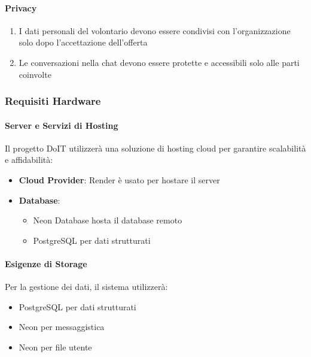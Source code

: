 \paragraph{Privacy}

\begin{enumerate}
    \item I dati personali del volontario devono essere condivisi con l'organizzazione solo dopo l'accettazione dell'offerta
    \item Le conversazioni nella chat devono essere protette e accessibili solo alle parti coinvolte
\end{enumerate}

\subsubsection{Requisiti Hardware}

\paragraph{Server e Servizi di Hosting}

Il progetto DoIT utilizzerà una soluzione di hosting cloud per garantire scalabilità e affidabilità:

\begin{itemize}
    \item \textbf{Cloud Provider}: Render è usato per hostare il server
    \item \textbf{Database}:
    \begin{itemize}
        \item Neon Database hosta il database remoto
        \item PostgreSQL per dati strutturati
    \end{itemize}
\end{itemize}

\paragraph{Esigenze di Storage}

Per la gestione dei dati, il sistema utilizzerà:

\begin{itemize}
    \item PostgreSQL per dati strutturati
    \item Neon per messaggistica
    \item Neon per file utente
\end{itemize}

